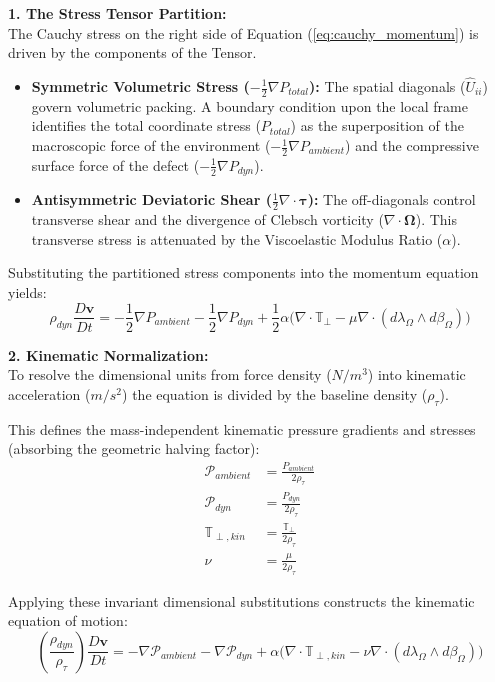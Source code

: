 \textbf{1. The Stress Tensor Partition:} \\ 
The Cauchy stress on the right side of Equation (\ref{eq:cauchy_momentum}) is driven by the components of the Tensor. 
\begin{itemize}
    \item \textbf{Symmetric Volumetric Stress ($-\frac{1}{2}\nabla P_{total}$):} The spatial diagonals ($\hat{U}_{ii}$) govern volumetric packing. A boundary condition upon the local frame identifies the total coordinate stress ($P_{total}$) as the superposition of the macroscopic force of the environment ($-\frac{1}{2}\nabla P_{ambient}$) and the compressive surface force of the defect ($-\frac{1}{2}\nabla P_{dyn}$). 
    \item \textbf{Antisymmetric Deviatoric Shear ($\frac{1}{2}\nabla \cdot \boldsymbol{\tau}$):} The off-diagonals control transverse shear and the divergence of Clebsch vorticity ($\nabla \cdot \boldsymbol{\Omega}$). This transverse stress is attenuated by the Viscoelastic Modulus Ratio ($\alpha$). 
\end{itemize}

Substituting the partitioned stress components into the momentum equation yields: 
\begin{equation}
    \rho_{dyn} \frac{D\mathbf{v}}{Dt} = -\frac{1}{2}\nabla P_{ambient} - \frac{1}{2}\nabla P_{dyn} + \frac{1}{2}\alpha \big( \nabla \cdot \mathbb{T}_{\perp} - \mu \nabla \cdot (d\lambda_\Omega \wedge d\beta_\Omega) \big) 
\end{equation}

\textbf{2. Kinematic Normalization:} \\ 
To resolve the dimensional units from force density ($N/m^3$) into kinematic acceleration ($m/s^2$) the equation is divided by the baseline density ($\rho_\tau$). 

This defines the mass-independent kinematic pressure gradients and stresses (absorbing the geometric halving factor):
\begin{align}
    \mathcal{P}_{ambient} &= \frac{P_{ambient}}{2\rho_\tau} \\ 
    \mathcal{P}_{dyn} &= \frac{P_{dyn}}{2\rho_\tau} \\ 
    \mathbb{T}_{\perp, kin} &= \frac{\mathbb{T}_{\perp}}{2\rho_\tau} \\ 
    \nu &= \frac{\mu}{2\rho_\tau} 
\end{align}

Applying these invariant dimensional substitutions constructs the kinematic equation of motion:
\begin{equation}
    \left( \frac{\rho_{dyn}}{\rho_\tau} \right) \frac{D\mathbf{v}}{Dt} = -\nabla \mathcal{P}_{ambient} - \nabla \mathcal{P}_{dyn} + \alpha \big( \nabla \cdot \mathbb{T}_{\perp, kin} - \nu \nabla \cdot (d\lambda_\Omega \wedge d\beta_\Omega) \big) \label{eq:kinematic_ns} 
\end{equation}



